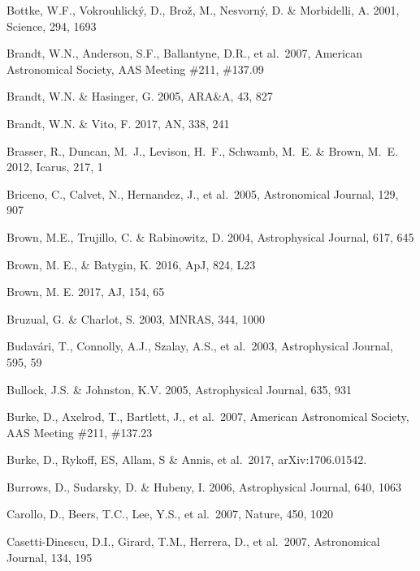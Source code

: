 \documentclass[twocolumn]{aastex61}
\begin{document}
\begin{thebibliography}{}
 Bottke, W.F., Vokrouhlick\'{y}, D., Bro\v{z}, M., Nesvorn\'y, D. \& Morbidelli, A. 2001, Science, 294, 1693

 Brandt, W.N., Anderson, S.F., Ballantyne, D.R., et al.~2007, American Astronomical Society, AAS Meeting \#211, \#137.09

 Brandt, W.N. \& Hasinger, G. 2005, ARA\&A, 43, 827

 Brandt, W.N. \& Vito, F. 2017, AN, 338, 241

 Brasser, R., Duncan, M.~J., Levison, H.~F., Schwamb, M.~E. \& Brown, M.~E. 2012, Icarus, 217, 1

 Briceno, C., Calvet, N., Hernandez, J., et al.~2005, Astronomical Journal, 129, 907

 Brown, M.E., Trujillo, C. \& Rabinowitz, D. 2004, Astrophysical Journal, 617, 645

 Brown, M. E., \& Batygin, K. 2016, ApJ, 824, L23

 Brown, M. E. 2017, AJ, 154, 65

 Bruzual, G. \& Charlot, S. 2003, MNRAS, 344, 1000

 Budav\'{a}ri, T., Connolly, A.J., Szalay, A.S., et al.~2003, Astrophysical Journal, 595, 59

 Bullock, J.S. \& Johnston, K.V. 2005,  Astrophysical Journal, 635, 931

 Burke, D., Axelrod, T., Bartlett, J., et al.~2007, American Astronomical Society, AAS Meeting \#211, \#137.23

 Burke, D., Rykoff, ES, Allam, S \& Annis, et al.~2017, arXiv:1706.01542.

 Burrows, D., Sudarsky, D. \& Hubeny, I. 2006, Astrophysical Journal, 640, 1063

 Carollo, D., Beers, T.C., Lee, Y.S., et al.~2007, Nature, 450, 1020

 Casetti-Dinescu, D.I., Girard, T.M., Herrera, D., et al.~2007, Astronomical Journal, 134, 195


\end{thebibliography}
\end{document}
